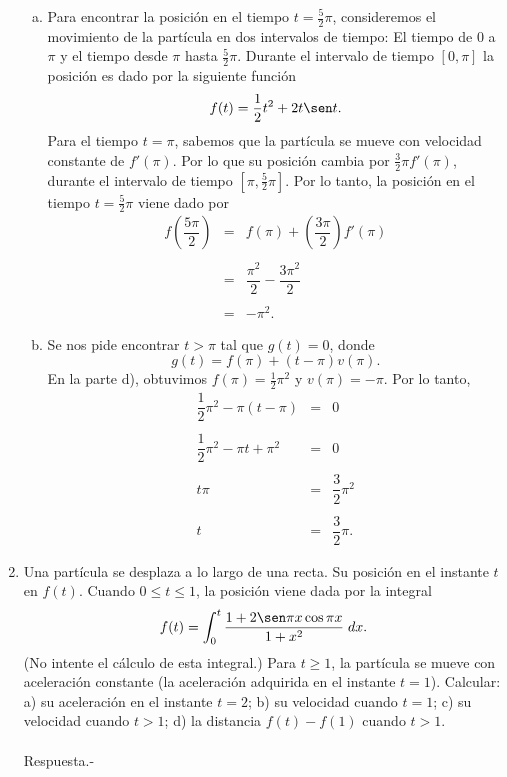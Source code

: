 \begin{enumerate}[\bfseries 1.]
\begin{enumerate}[a)]
	    \item Para encontrar la posición en el tiempo $t=\frac{5}{2}\pi$, consideremos el movimiento de la partícula en dos intervalos de tiempo: El tiempo de $0$ a $\pi$ y el tiempo desde $\pi$ hasta $\frac{5}{2}\pi$. Durante el intervalo de tiempo $[0,\pi]$ la posición es dado por la siguiente función 
		$$f(t)=\dfrac{1}{2}t^2+2t\sen t.$$
		Para el tiempo $t=\pi$, sabemos que la partícula se mueve con velocidad constante de $f'(\pi)$. Por lo que su posición cambia por $\frac{3}{2}\pi f'(\pi)$, durante el intervalo de tiempo $[\pi,\frac{5}{2}\pi]$. Por lo tanto, la posición en el tiempo $t=\frac{5}{2}\pi$ viene dado por 
		$$\begin{array}{rcl}
		    f\left(\dfrac{5\pi}{2}\right) &=& f(\pi) + \left(\dfrac{3\pi}{2}\right) f'(\pi)\\\\
						  &=&\dfrac{\pi^2}{2}-\dfrac{3\pi^2}{2}\\\\
						  &=& -\pi^2.
		\end{array}$$
		\vspace{.5cm}

	    \item Se nos pide encontrar $t>\pi$ tal que $g(t)=0$, donde 
		$$g(t)=f(\pi)+(t-\pi)v(\pi).$$
		En la parte d), obtuvimos $f(\pi)=\frac{1}{2}\pi^2$ y $v(\pi)=-\pi$. Por lo tanto, 
		$$\begin{array}{rcl}
		    \dfrac{1}{2}\pi^2-\pi(t-\pi)&=&0\\\\
		    \dfrac{1}{2}\pi^2-\pi t + \pi^2&=&0\\\\
		    t\pi &=&\dfrac{3}{2}\pi^2\\\\
		    t&=&\dfrac{3}{2}\pi.
		\end{array}$$
		\vspace{.5cm}
	\end{enumerate}

    \item Una partícula se desplaza a lo largo de una recta. Su posición en el instante $t$ en $f(t)$. Cuando $0\leq t \leq 1$, la posición viene dada por la integral
    $$f(t)=\int_0^t \dfrac{1+2\sen \pi x \cos \pi x}{1+x^2}\; dx.$$
    (No intente el cálculo de esta integral.) Para $t\geq 1$, la partícula se mueve con aceleración constante (la aceleración adquirida en el instante $t=1$). Calcular: a) su aceleración en el instante $t=2$; b) su velocidad cuando $t=1$; c) su velocidad cuando $t>1$; d) la distancia $f(t)-f(1)$ cuando $t>1$.\\\\
    	Respuesta.-\;


\end{enumerate}
